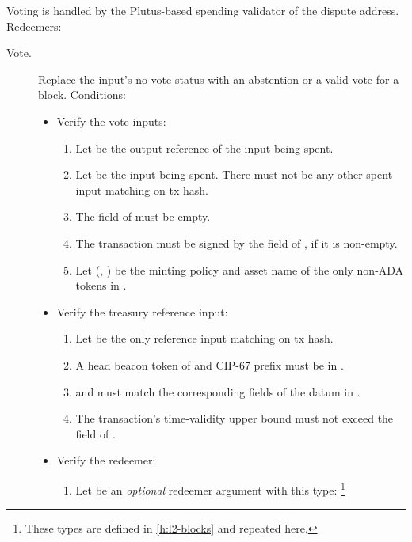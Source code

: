 \documentclass[../hydrozoa.tex]{subfiles}
\begin{document}
Voting is handled by the Plutus-based spending validator of the dispute address.
Redeemers:
\begin{description}
  \item[Vote.] Replace the input's no-vote status with an abstention or a valid vote for a block. Conditions:
    \begin{itemize}
      \item Verify the vote inputs:
        \begin{enumerate}
          \item Let  be the output reference of the input being spent.
          \item Let  be the input being spent.
            There must not be any other spent input matching  on tx hash.
          \item The  field of  must be empty.
          \item The transaction must be signed by the  field of , if it is non-empty.
          \item Let (, ) be the minting policy and asset name of the only non-ADA tokens in .
        \end{enumerate}
      \item Verify the treasury reference input:
        \begin{enumerate}[resume]
          \item Let  be the only reference input matching  on tx hash.
          \item A head beacon token of  and CIP-67 prefix \headBeaconToken{} must be in .
          \item {} and  must match the corresponding fields of the  datum in .
          \item The transaction's time-validity upper bound must not exceed the  field of .
        \end{enumerate}
      \item Verify the redeemer:
        \begin{enumerate}[resume]
          \item Let  be an \emph{optional} redeemer argument with this type:%
            \footnote{These types are defined in \cref{h:l2-blocks} and repeated here.}
            \begin{equation*}

\end{equation*}
\end{enumerate}
\end{itemize}
\end{description}
\end{document}
